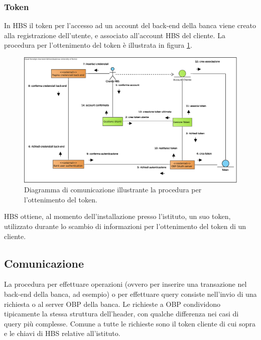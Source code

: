 \subsubsection{Token}

In HBS il token per l'accesso ad un account del back-end della banca viene creato alla registrazione dell'utente, e associato all'account HBS del cliente.
La procedura per l'ottenimento del token \`e illustrata in figura \ref{fig:oauth:token}.

\begin{figure}[h]
    \centering
	\includegraphics[width=\textwidth]{Images/Ottenimento_Token.eps}
    \caption{Diagramma di comunicazione illustrante la procedura per l'ottenimento del token.}
    \label{fig:oauth:token}
\end{figure}

HBS ottiene, al momento dell'installazione presso l'istituto, un suo token, utilizzato durante lo scambio di informazioni per l'ottenimento del token di un cliente.

\subsection{Comunicazione}

La procedura per effettuare operazioni (ovvero per inserire una transazione nel back-end della banca, ad esempio) o per effettuare query consiste nell'invio di una richiesta  o  al server OBP della banca.
Le richieste a OBP condividono tipicamente la stessa struttura dell'header, con qualche differenza nei casi di query pi\`u complesse.
Comune a tutte le richieste sono il token cliente di cui sopra e le chiavi di HBS relative all'istituto.

